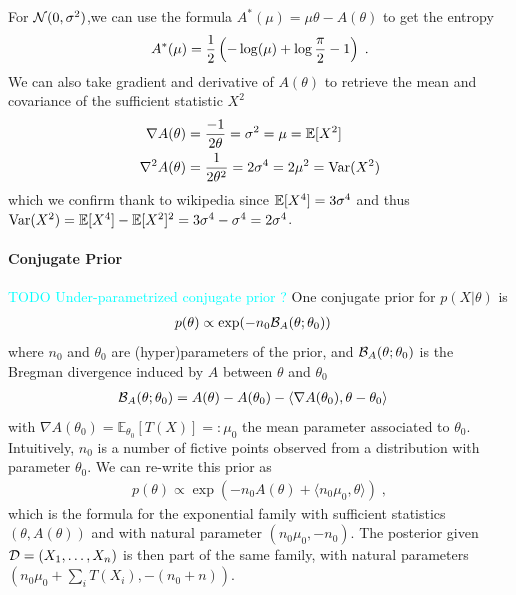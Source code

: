 \documentclass{article}
\newcommand{\TODO}[1]{\textcolor{cyan}{TODO #1}}
\newcommand*{\expect}[2][]{\ensuremath{\mathbb{E}_{#1} \left[ #2 \right] }} %
\newcommand{\logpart}{A}
\newcommand{\conj}{\logpart^*}
\newcommand{\bregman}{\cB_\logpart}
\newcommand{\natp}{\theta}
\newcommand{\meanp}{\mu}
\begin{document}
\begin{example}
For ${\mathcal N}(0,\sigma^2)$,we can use the formula $\conj(\mu) = \mu \natp - \logpart(\natp)$ to get the entropy
\begin{align}
	\conj(\mu) = \half\left( -\log(\mu) + \log\frac{\pi}{2} - 1 \right) \; .
\end{align}
We can also take gradient and derivative of $\logpart(\natp)$ to retrieve the mean and covariance of the sufficient statistic $X^2$
\begin{align}
	\nabla\logpart(\natp) &= \frac{-1}{2 \natp} = \sigma^2 = \mu = \E[X^2] \\
	\nabla^2\logpart(\natp) &= \frac{1}{2 \natp^2} = 2 \sigma^4 = 2 \mu^2 = \Var(X^2) 
\end{align}
which we confirm thank to wikipedia since $\operatorname{\mathbb{E}}[X^4] = 3 \sigma^4$ and thus $\operatorname{\mathrm{Var}}(X^2) = \operatorname{\mathbb{E}}[X^4] - \operatorname{\mathbb{E}}[X^2]^2 = 3 \sigma^4 - \sigma^4 = 2 \sigma^4$.
\end{example}

\paragraph{Conjugate Prior}
\TODO{Under-parametrized conjugate prior ?}
One conjugate prior for $p(X|\natp)$ is
\begin{align}
    p(\natp) &\propto \exp( - n_0 \bregman(\natp ; \natp_0) )
\end{align}
where $n_0$ and $\natp_0$ are (hyper)parameters of the prior, and $\bregman(\natp ; \natp_0)$ is the Bregman divergence induced by $\logpart$ between $\natp$ and $\natp_0$
\begin{align}
    \bregman (\natp ; \natp_0)
    & = \logpart(\natp) - \logpart(\natp_0) 
    - \langle \nabla \logpart(\natp_0)  , \natp - \natp_0 \rangle
\end{align}
with $\nabla \logpart(\natp_0) = \expect[\natp_0]{T(X)} =: \meanp_0$ the mean parameter associated to $\natp_0$. 
Intuitively, $n_0$ is a number of fictive points observed from a distribution with parameter $\natp_0$.
We can re-write this prior as 
\begin{align}
    p(\natp) \propto 
    \exp( -n_0 \logpart (\natp) 
    + \langle n_0 \mu_0, \natp \rangle ) \; ,
\end{align}
which is the formula for the exponential family with sufficient statistics $(\natp ,\logpart(\natp))$ and with natural parameter $(n_0 \mu_0, -n_0)$.
The posterior given ${\mathcal D}=(X_1,\dots, X_n)$ is then part of the same family, with natural parameters $(n_0 \mu_0 + \sum_i T(X_i) , -(n_0 + n))$.
\end{document}
